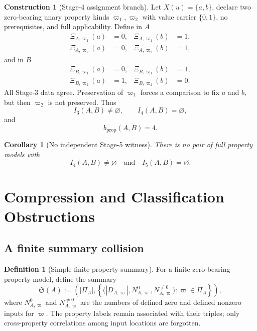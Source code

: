 \documentclass[11pt]{article}
\newtheorem{corollary}[theorem]{Corollary}
\theoremstyle{definition}
\newtheorem{definition}[theorem]{Definition}
\newtheorem{construction}[theorem]{Construction}
\theoremstyle{remark}
\begin{document}
\begin{construction}[Stage-4 assignment branch]
Let \(X(u)=\{a,b\}\), declare two zero-bearing unary property kinds \(\varpi_1,\varpi_2\) with value carrier \(\{0,1\}\), no prerequisites, and full applicability.
Define in \(A\)
\[
\begin{aligned}
\Xi_{A,\varpi_1}(a)&=0,&\Xi_{A,\varpi_1}(b)&=1,\\
\Xi_{A,\varpi_2}(a)&=0,&\Xi_{A,\varpi_2}(b)&=1,
\end{aligned}
\]
and in \(B\)
\[
\begin{aligned}
\Xi_{B,\varpi_1}(a)&=0,&\Xi_{B,\varpi_1}(b)&=1,\\
\Xi_{B,\varpi_2}(a)&=1,&\Xi_{B,\varpi_2}(b)&=0.
\end{aligned}
\]
All Stage-3 data agree.
Preservation of \(\varpi_1\) forces a comparison to fix \(a\) and \(b\), but then \(\varpi_2\) is not preserved.
Thus
\[
I_3(A,B)\neq\varnothing,
\qquad
I_4(A,B)=\varnothing,
\]and
\[
b_{\mathrm{prop}}(A,B)=4.
\]
\end{construction}

\begin{corollary}[No independent Stage-5 witness]
There is no pair of full property models with
\[
I_4(A,B)\neq\varnothing
\quad\text{and}\quad
I_5(A,B)=\varnothing.
\]
\end{corollary}

\section{Compression and Classification Obstructions}
\label{sec:compression}

\subsection{A finite summary collision}

\begin{definition}[Simple finite property summary]
For a finite zero-bearing property model, define the summary
\[
\mathfrak S(A):=
\left(
|\Pi_A|,
\left\{
\bigl(|D_{A,\varpi}|,N^0_{A,\varpi},N^{\neq0}_{A,\varpi}\bigr)
:\varpi\in\Pi_A
\right\}
\right),
\]
where \(N^0_{A,\varpi}\) and \(N^{\neq0}_{A,\varpi}\) are the numbers of defined zero and defined nonzero inputs for \(\varpi\).
The property labels remain associated with their triples; only cross-property correlations among input locations are forgotten.
\end{definition}
\end{document}
